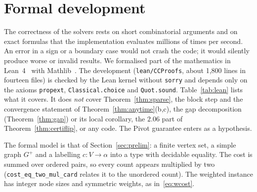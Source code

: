 \section{Formal development}\label{app:lean}

The correctness of the solvers rests on short combinatorial arguments and on
exact formulas that the implementation evaluates millions of times per
second.  An error in a sign or a boundary case would not crash the code; it
would silently produce worse or invalid results.  We formalised part of the
mathematics in Lean~4~\cite{deMouraU21lean4} with
Mathlib~\cite{mathlib2020}.  The development (\texttt{lean/CCProofs}, about
1{,}800 lines in fourteen files) is checked by the Lean kernel without
\texttt{sorry} and depends only on the axioms \texttt{propext},
\texttt{Classical.choice} and \texttt{Quot.sound}.  Table~\ref{tab:lean} lists
what it covers.  It does \emph{not} cover Theorem~\ref{thm:sparse}, the block
step and the convergence statement of Theorem~\ref{thm:anytime}(b,c), the gap
decomposition (Theorem~\ref{thm:gap}) or its local corollary, the $2.06$ part
of Theorem~\ref{thm:certiflip}, or any code.  The Pivot guarantee enters as a
hypothesis.

The formal model is that of Section~\ref{sec:prelim}: a finite vertex set, a
simple graph $G^+$ and a labelling $c:V\to\alpha$ into a type with decidable
equality.  The cost is summed over ordered pairs, so every count appears
multiplied by two (\texttt{cost\_eq\_two\_mul\_card} relates it to the
unordered count).  The weighted instance has integer node sizes and symmetric
weights, as in~\eqref{eq:wcost}.

